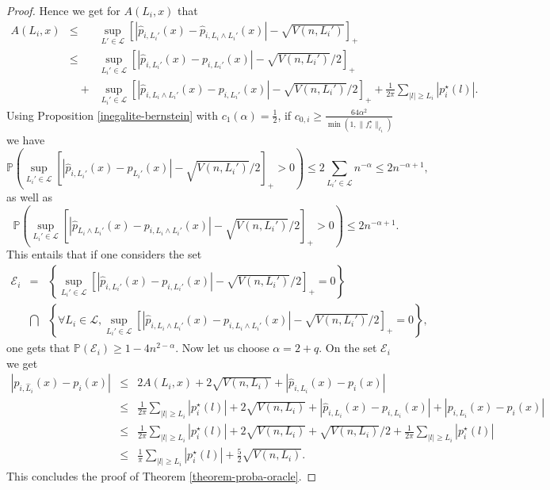 \documentclass[11pt,a4paper,openany]{article}
\begin{document}
\begin{proof}
Hence we get for $A(L_i,x)$ that
\begin{eqnarray*}
A(L_i,x) &\leq& \sup_{L'\in \mathcal{L}} [| \widehat p_{i, L_i'}(x) - \widehat p_{i, L_i \wedge L_i'}(x) | - \sqrt{V(n,L_i')}]_{+} \\
&\leq &  \sup_{L_i'\in \mathcal{L}} [| \widehat p_{i, L_i'}(x) - p_{i, L_i'}(x) | - \sqrt{V(n,L_i')}/2]_{+} \\
&\quad +& \sup_{L_i'\in \mathcal{L}} [| \widehat p_{i, L_i \wedge L_i'}(x) - p_{i, L_i'}(x) | - \sqrt{V(n,L_i')}/2]_{+}  +  \frac {1}{2\pi }  \sum_{|l| \geq   L _i} |p_i^\star(l)|.
\end{eqnarray*}
Using Proposition \ref{inegalite-bernstein} with $c_1(\alpha)=\frac 1 2$, if $c_{0,i} \geq \frac{64 \alpha^2}{\min(1, \| f_{\varepsilon}^{\star}\|_{\ell_1})}$ we have
$$
\mathbb{P}( \sup_{L_i'\in \mathcal{L}} [| \widehat p_{i, L_i'}(x) -  p_{ L_i'}(x) | - \sqrt{V(n,L_i')}/2]_{+} >0) \leq 2 \sum_{L_i' \in \mathcal{L}} n^{-\alpha} \leq 2 n^{-\alpha+1},
$$
as well as 
$$
\mathbb{P}( \sup_{L_i'\in \mathcal{L}} [| \widehat p_{L_i \wedge L_i'}(x) - p_{i, L_i\wedge L_i'}(x) | - \sqrt{V(n,L_i')}/2]_{+} >0)  \leq 2 n^{-\alpha+1} .
$$
This entails that if one considers the set
\begin{eqnarray*}
\mathcal{E}_i&=&\left \{ \sup_{L_i'\in \mathcal{L}} [| \widehat p_{i, L_i'}(x) -  p_{i, L_i'}(x) | - \sqrt{V(n,L_i')}/2]_{+} =0 \right \}   \\
 &\bigcap&
\left \{ \forall L_i \in \mathcal{L},   \sup_{L_i'\in \mathcal{L}} [| \widehat p_{i, L_i \wedge L_i'}(x) - p_{i, L_i\wedge L_i'}(x) | - \sqrt{V(n,L_i')}/2]_{+} =0 \right \},
\end{eqnarray*}
one gets that $\mathbb{P}(\mathcal{E}_i) \geq 1- 4n^{2 -\alpha}$. 
Now let us choose $\alpha= 2 +q$. %
 On the set $\mathcal{E}_i$ we get 
 \begin{eqnarray*}
 | \widehat p_{i, \hat L_i}(x)-p_i(x)| &\leq& 2 A(L_i,x) + 2 \sqrt{V(n,L_i)} + |\widehat p_{i, L_i}(x)- p_i(x)| \\
 & \leq &   \frac {1}{2\pi }  \sum_{|l| \geq  L_i } |p_i^\star(l)|+ 2 \sqrt{V(n,L_i)} + |\widehat p_{i, L_i}(x) -p_{i, L_i}(x)| + | p_{i, L_i}(x)- p_i(x)| \\
 & \leq &   \frac {1}{2\pi }  \sum_{|l| \geq   L_i } |p_i^\star(l)| + 2 \sqrt{V(n,L_i)} + \sqrt{V(n,L_i)}/2  +\frac{1}{2\pi} \sum_{|l| \geq L_i} |p_i^\star(l)|\\
 & \leq & \frac{1}{ \pi}  \sum_{|l| \geq L_i} |p_i^\star(l)| + \frac{5}{2} \sqrt{V(n,L_i)}. 
 \end{eqnarray*}
 This concludes the proof of Theorem \ref{theorem-proba-oracle}.
\end{proof}
\end{document}
